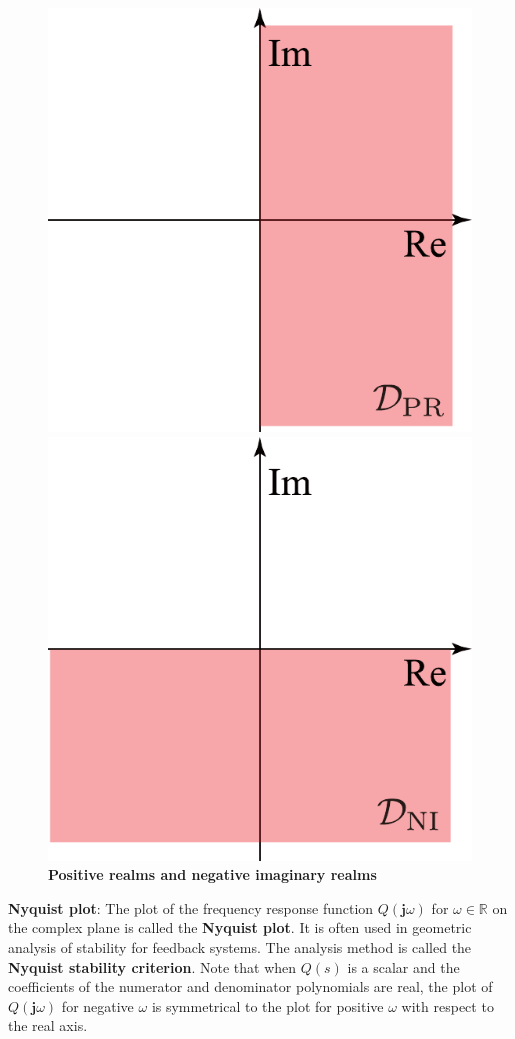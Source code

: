 \documentclass[graybox, envcountchap]{svmult}
\begin{document}
\begin{figure}[t]
  \centering
  {
  \begin{minipage}{0.49\linewidth}
    \centering
    \includegraphics[width = .65\linewidth]{figs/PRdom}
    \medskip
  \end{minipage}
  \begin{minipage}{0.49\linewidth}
    \centering
    \includegraphics[width = .65\linewidth]{figs/NIdom}
    \medskip
  \end{minipage}
  }
  \medskip
  \caption{\textbf{Positive realms and negative imaginary realms}}
  \label{fig:PRandNI}
\medskip
\end{figure}


\begin{COLUMN}
\noindent \textbf{Nyquist plot}:
The plot of the frequency response function $Q(\bm{j}\omega)$ for
$\omega\in\mathbb{R}$ on the complex plane is called the \textbf{Nyquist
plot}. It is often used in geometric analysis of stability
for feedback systems. The analysis method is called the \textbf{Nyquist
stability criterion}. Note that when $Q(s)$
is a scalar and the coefficients of the numerator and denominator polynomials
are real, the plot of $Q(\bm{j}\omega)$ for negative $\omega$ is symmetrical to
the plot for positive $\omega$ with respect to the real axis.
\end{COLUMN}
\end{document}
